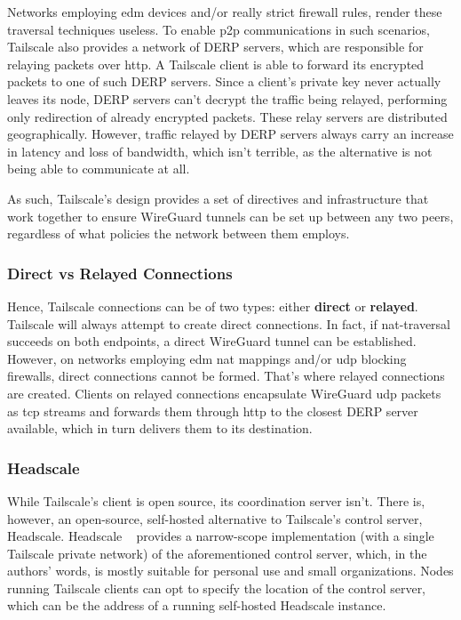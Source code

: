 \documentclass[11pt,twoside,a4paper]{report}
\begin{document}
Networks employing \ac{edm} devices and/or really strict firewall rules, render these traversal techniques useless. To enable \ac{p2p} communications in such scenarios, Tailscale also provides a network of \ac{DERP} servers, which are responsible for relaying packets over \ac{http}. A Tailscale client is able to forward its encrypted packets to one of such \ac{DERP} servers. Since a client's private key never actually leaves its node, \ac{DERP} servers can't decrypt the traffic being relayed, performing only redirection of already encrypted packets. These relay servers are distributed geographically. However, traffic relayed by \ac{DERP} servers always carry an increase in latency and loss of bandwidth, which isn't terrible, as the alternative is not being able to communicate at all.

As such, Tailscale's design provides a set of directives and infrastructure that work together to ensure WireGuard tunnels can be set up between any two peers, regardless of what policies the network between them employs.

\subsubsection{Direct vs Relayed Connections}

Hence, Tailscale connections can be of two types: either \textbf{direct} or \textbf{relayed}. Tailscale will always attempt to create direct connections. In fact, if \ac{nat}-traversal succeeds on both endpoints, a direct WireGuard tunnel can be established. However, on networks employing \ac{edm} \ac{nat} mappings and/or \ac{udp} blocking firewalls, direct connections cannot be formed. That's where relayed connections are created. Clients on relayed connections encapsulate WireGuard \ac{udp} packets as \ac{tcp} streams and forwards them through \ac{http} to the closest \ac{DERP} server available, which in turn delivers them to its destination.

\subsubsection{Headscale}
\label{sec:hs}

While Tailscale's client is open source, its coordination server isn't. There is, however, an open-source, self-hosted alternative to Tailscale's control server, Headscale. Headscale ~\cite{headscale2023online} provides a narrow-scope implementation (with a single Tailscale private network) of the aforementioned control server, which, in the authors' words, is mostly suitable for personal use and small organizations. Nodes running Tailscale clients can opt to specify the location of the control server, which can be the address of a running self-hosted Headscale instance.
\end{document}
